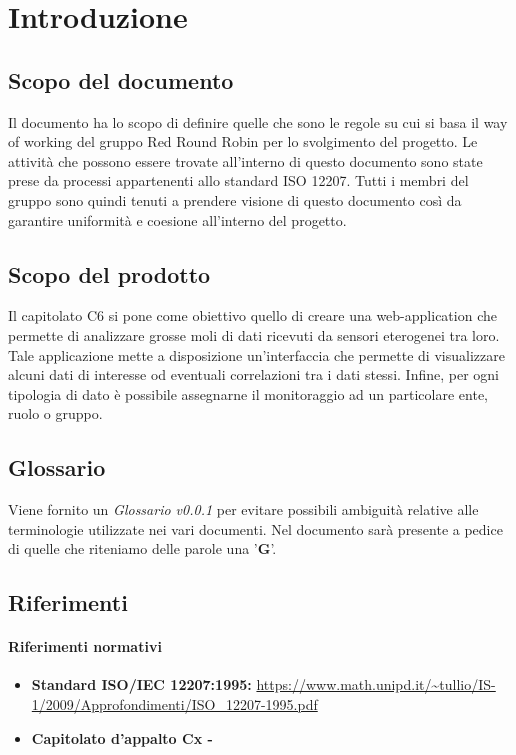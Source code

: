 \section{Introduzione}
	\subsection{Scopo del documento}
		Il documento ha lo scopo di definire quelle che sono le regole su cui si basa il way of working del gruppo Red Round Robin per lo svolgimento del progetto. Le attività che possono essere trovate all'interno di questo documento sono state prese da processi appartenenti allo standard ISO 12207. Tutti i membri del gruppo sono quindi tenuti a prendere visione di questo documento così da garantire uniformità e coesione all'interno del progetto.   
	\subsection{Scopo del prodotto}
		Il capitolato C6 si pone come obiettivo quello di creare una web-application che permette di analizzare grosse moli di dati ricevuti da sensori eterogenei tra loro. Tale applicazione mette a disposizione un'interfaccia che permette di visualizzare alcuni dati di interesse od eventuali correlazioni tra i dati stessi. Infine, per ogni tipologia di dato è possibile assegnarne il monitoraggio ad un particolare ente, ruolo o gruppo. 
	\subsection{Glossario}
		Viene fornito un \textit{Glossario v0.0.1} per evitare possibili ambiguità relative alle terminologie utilizzate nei vari documenti. Nel documento sarà presente a pedice di quelle che riteniamo delle parole una '\textbf{G}'.
	\subsection{Riferimenti}

		\paragraph{Riferimenti normativi}
			\begin{itemize}
				\item \textbf{Standard ISO/IEC 12207:1995: } 
				\url{https://www.math.unipd.it/~tullio/IS-1/2009/Approfondimenti/ISO_12207-1995.pdf}
				\item \textbf{Capitolato d'appalto Cx -} 
				\url{}
			\end{itemize}	
